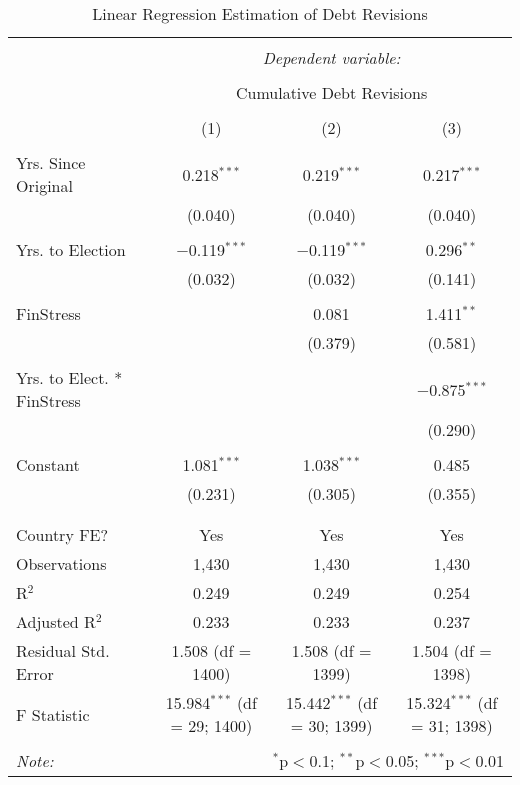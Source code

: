 
\begin{table}[!htbp] \centering 
  \caption{Linear Regression Estimation of Debt Revisions} 
  \label{debt_results} 
\footnotesize 
\begin{tabular}{@{\extracolsep{5pt}}lccc} 
\\[-1.8ex]\hline 
\hline \\[-1.8ex] 
 & \multicolumn{3}{c}{\textit{Dependent variable:}} \\ 
\cline{2-4} 
\\[-1.8ex] & \multicolumn{3}{c}{Cumulative Debt Revisions} \\ 
\\[-1.8ex] & (1) & (2) & (3)\\ 
\hline \\[-1.8ex] 
 Yrs. Since Original & 0.218$^{***}$ & 0.219$^{***}$ & 0.217$^{***}$ \\ 
  & (0.040) & (0.040) & (0.040) \\ 
  & & & \\ 
 Yrs. to Election & $-$0.119$^{***}$ & $-$0.119$^{***}$ & 0.296$^{**}$ \\ 
  & (0.032) & (0.032) & (0.141) \\ 
  & & & \\ 
 FinStress &  & 0.081 & 1.411$^{**}$ \\ 
  &  & (0.379) & (0.581) \\ 
  & & & \\ 
 Yrs. to Elect. * FinStress &  &  & $-$0.875$^{***}$ \\ 
  &  &  & (0.290) \\ 
  & & & \\ 
 Constant & 1.081$^{***}$ & 1.038$^{***}$ & 0.485 \\ 
  & (0.231) & (0.305) & (0.355) \\ 
  & & & \\ 
\hline \\[-1.8ex] 
Country FE? & Yes & Yes & Yes \\ 
Observations & 1,430 & 1,430 & 1,430 \\ 
R$^{2}$ & 0.249 & 0.249 & 0.254 \\ 
Adjusted R$^{2}$ & 0.233 & 0.233 & 0.237 \\ 
Residual Std. Error & 1.508 (df = 1400) & 1.508 (df = 1399) & 1.504 (df = 1398) \\ 
F Statistic & 15.984$^{***}$ (df = 29; 1400) & 15.442$^{***}$ (df = 30; 1399) & 15.324$^{***}$ (df = 31; 1398) \\ 
\hline 
\hline \\[-1.8ex] 
\textit{Note:}  & \multicolumn{3}{r}{$^{*}$p$<$0.1; $^{**}$p$<$0.05; $^{***}$p$<$0.01} \\ 
\end{tabular} 
\end{table} 

